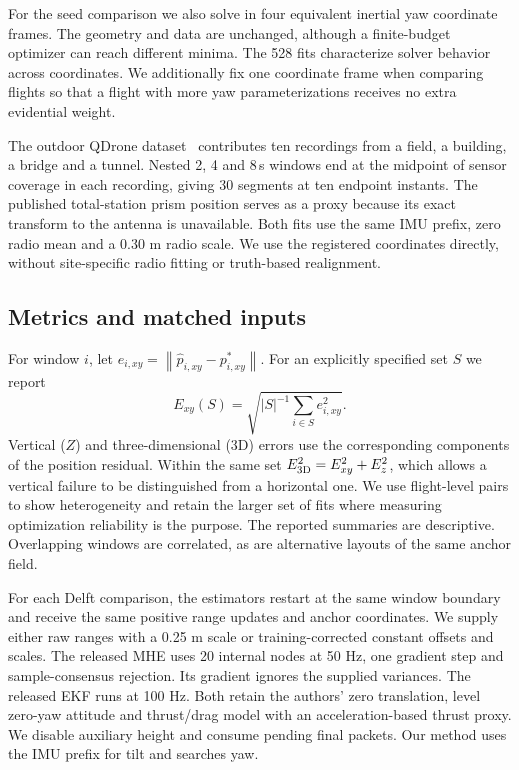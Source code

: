 \documentclass{IEEEtaes}
\newcommand{\norm}[1]{\left\lVert#1\right\rVert}
\begin{document}
For the seed comparison we also solve in four equivalent inertial yaw coordinate frames. The geometry and data are unchanged, although a finite-budget optimizer can reach different minima. The 528 fits characterize solver behavior across coordinates. We additionally fix one coordinate frame when comparing flights so that a flight with more yaw parameterizations receives no extra evidential weight.

The outdoor QDrone dataset~\cite{qdrone} contributes ten recordings from a field, a building, a bridge and a tunnel. Nested 2, 4 and 8\,s windows end at the midpoint of sensor coverage in each recording, giving 30 segments at ten endpoint instants. The published total-station prism position serves as a proxy because its exact transform to the antenna is unavailable. Both fits use the same IMU prefix, zero radio mean and a \(0.30\) m radio scale. We use the registered coordinates directly, without site-specific radio fitting or truth-based realignment.

\subsection{Metrics and matched inputs}
For window \(i\), let \(e_{i,xy}=\norm{\hat p_{i,xy}-p^*_{i,xy}}\). For an explicitly specified set \(S\) we report
\begin{equation}
 E_{xy}(S)=\sqrt{|S|^{-1}\sum_{i\in S}e_{i,xy}^2}. \label{eq:score}
\end{equation}
Vertical (\(Z\)) and three-dimensional (3D) errors use the corresponding components of the position residual. Within the same set \(E_{\rm 3D}^2=E_{xy}^2+E_z^2\), which allows a vertical failure to be distinguished from a horizontal one. We use flight-level pairs to show heterogeneity and retain the larger set of fits where measuring optimization reliability is the purpose. The reported summaries are descriptive. Overlapping windows are correlated, as are alternative layouts of the same anchor field.

For each Delft comparison, the estimators restart at the same window boundary and receive the same positive range updates and anchor coordinates. We supply either raw ranges with a 0.25 m scale or training-corrected constant offsets and scales. The released MHE uses 20 internal nodes at 50 Hz, one gradient step and sample-consensus rejection. Its gradient ignores the supplied variances. The released EKF runs at 100 Hz. Both retain the authors' zero translation, level zero-yaw attitude and thrust/drag model with an acceleration-based thrust proxy. We disable auxiliary height and consume pending final packets. Our method uses the IMU prefix for tilt and searches yaw.
\end{document}
